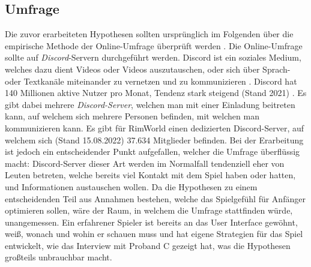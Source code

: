 \subsection{Umfrage}
Die zuvor erarbeiteten Hypothesen sollten ursprünglich im Folgenden über die empirische Methode der Online-Umfrage überprüft werden \cite*[]{Evans2005TheVO}.  Die Online-Umfrage sollte auf \textit{Discord}-Servern durchgeführt werden. Discord ist ein soziales Medium, welches dazu dient Videos oder Videos auszutauschen, oder sich über Sprach- oder Textkanäle miteinander zu vernetzen und zu kommunizieren \cite*[]{discord:usage}. Discord hat 140 Millionen aktive Nutzer pro Monat, Tendenz stark steigend (Stand 2021) \cite*[]{discord:statistics}. Es gibt dabei mehrere \textit{Discord-Server}, welchen man mit einer Einladung beitreten kann, auf welchem sich mehrere Personen befinden, mit welchen man kommunizieren kann. Es gibt für RimWorld einen dedizierten Discord-Server, auf welchem sich (Stand 15.08.2022) 37.634 Mitglieder befinden. Bei der Erarbeitung ist jedoch ein entscheidender Punkt aufgefallen, welcher die Umfrage überflüssig macht: Discord-Server dieser Art werden im Normalfall tendenziell eher von Leuten betreten, welche bereits viel Kontakt mit dem Spiel haben oder hatten, und Informationen austauschen wollen. Da die Hypothesen zu einem entscheidenden Teil aus Annahmen bestehen, welche das Spielgefühl für Anfänger optimieren sollen, wäre der Raum, in welchem die Umfrage stattfinden würde, unangemessen. Ein erfahrener Spieler ist bereits an das User Interface gewöhnt, weiß, wonach und wohin er schauen muss und hat eigene Strategien für das Spiel entwickelt, wie das Interview mit Proband C gezeigt hat, was die Hypothesen großteils unbrauchbar macht.